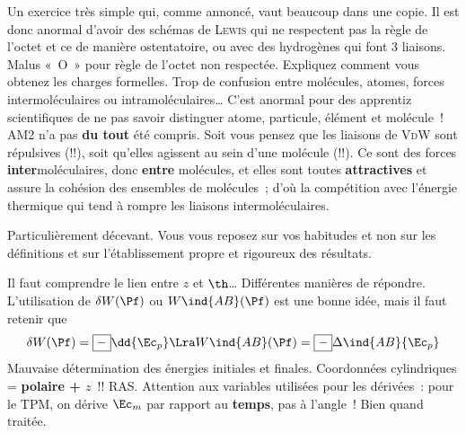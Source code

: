 \documentclass[a4paper, 12pt, final, garamond]{book}
\begin{document}
\setcounter{section}{0}
Un exercice très simple qui, comme annoncé, vaut beaucoup dans une copie. Il est
donc anormal d'avoir des schémas de \textsc{Lewis} qui ne respectent pas la
règle de l'octet et ce de manière ostentatoire, ou avec des hydrogènes qui font
3 liaisons. Malus «~O~» pour règle de l'octet non respectée.
\smallbreak
Expliquez comment vous obtenez les charges formelles.
\smallbreak
Trop de confusion entre molécules, atomes, forces intermoléculaires ou
intramoléculaires… C'est anormal pour des apprentiz scientifiques de ne pas
savoir distinguer atome, particule, élément et molécule~!
\smallbreak
AM2 n'a pas \textbf{du tout} été compris. Soit vous pensez que les liaisons de
\textsc{VdW} sont répulsives (!!), soit qu'elles agissent au sein d'une molécule
(!!). Ce sont des forces \textbf{inter}moléculaires, donc \textbf{entre}
molécules, et elles sont toutes \textbf{attractives} et assure la cohésion des
ensembles de molécules~; d'où la compétition avec l'énergie thermique qui tend à
rompre les liaisons intermoléculaires.

Particulièrement décevant. Vous vous reposez sur vos habitudes et non sur les
définitions et sur l'établissement propre et rigoureux des résultats.
\begin{enumerate}
	Il faut comprendre le lien entre $z$ et $\th$…
	Différentes manières de répondre. L'utilisation de $\delta W(\Pf)$ ou
	$W\ind{AB}(\Pf)$ est une bonne idée, mais il faut retenir que
	\[
		\delta W(\Pf) = \boxed{-}\dd{\Ec_p}
		\Lra
		W\ind{AB}(\Pf) = \boxed{-}\Delta\ind{AB}{\Ec_p}
	\]
	Mauvaise détermination des énergies initiales et finales.
	Coordonnées cylindriques = \textbf{polaire + $z$}~!!
	RAS.
	Attention aux variables utilisées pour les dérivées~: pour le TPM, on dérive
	$\Ec_m$ par rapport au \textbf{temps}, pas à l'angle~!
	\smallbreak
	Bien quand traitée.
\end{enumerate}
\end{document}
